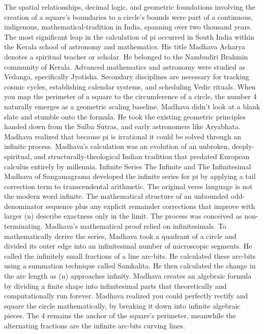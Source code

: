 {The spatial relationships, decimal logic, and geometric foundations involving the creation of a square’s boundaries to a circle’s bounds were part of a continuous, indigenous, mathematical-tradition in India, spanning over two thousand years. The most significant leap in the calculation of pi occurred in South India within the Kerala school of astronomy and mathematics. His title Madhava Acharya denotes a spiritual teacher or scholar. He belonged to the Nambudiri Brahmin community of Kerala. Advanced mathematics and astronomy were studied as Vedanga, specifically Jyotisha. Secondary disciplines are necessary for tracking cosmic cycles, establishing calendar systems, and scheduling Vedic rituals. When you map the perimeter of a square to the circumference of a circle, the number 4 naturally emerges as a geometric scaling baseline. Madhava didn’t look at a blank slate and stumble onto the formula. He took the existing geometric principles handed down from the Sulba Sutras, and early astronomers like Aryabhata. Madhava realized that because pi is irrational it could be solved through an infinite process. Madhava’s calculation was an evolution of an unbroken, deeply-spiritual, and structurally-theological Indian tradition that predated European calculus entirely by millennia.
Infinite Series
The Infinite and The Infinitesimal
Madhava of Sangamagrama developed the infinite series for pi by applying a tail correction term to transcendental arithmetic. The original verse language is not the modern word infinite. The mathematical structure of an unbounded odd-denominator sequence plus any explicit remainder corrections that improve with larger (n) describe exactness only in the limit. The process was conceived as non-terminating. Madhava's mathematical proof relied on infinitesimals. 
To mathematically derive the series, Madhava took a quadrant of a circle and divided its outer edge into an infinitesimal number of microscopic segments. He called the infinitely small fractions of a line arc-bits. He calculated these arc-bits using a summation technique called Samkalita. He then calculated the change in the arc length as (n) approaches infinity. Madhava creates an algebraic formula by dividing a finite shape into infinitesimal parts that theoretically and computationally run forever. Madhava realized you could perfectly rectify and square the circle mathematically, by breaking it down into infinite algebraic pieces. The 4 remains the anchor of the square’s perimeter, meanwhile the alternating fractions are the infinite arc-bits curving lines. 
}

